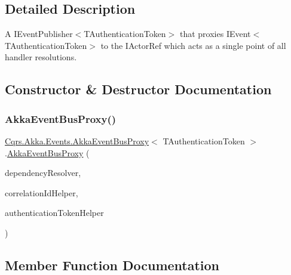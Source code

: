 \subsection{Detailed Description}
A I\+Event\+Publisher$<$\+T\+Authentication\+Token$>$ that proxies I\+Event$<$\+T\+Authentication\+Token$>$ to the I\+Actor\+Ref which acts as a single point of all handler resolutions. 



\subsection{Constructor \& Destructor Documentation}
\mbox{\label{classCqrs_1_1Akka_1_1Events_1_1AkkaEventBusProxy_a2f886b4e9e64188fe69478c39c96f2b5_a2f886b4e9e64188fe69478c39c96f2b5}} 
\subsubsection{\texorpdfstring{Akka\+Event\+Bus\+Proxy()}{AkkaEventBusProxy()}}
{\footnotesize\ttfamily \hyperlink{classCqrs_1_1Akka_1_1Events_1_1AkkaEventBusProxy}{Cqrs.\+Akka.\+Events.\+Akka\+Event\+Bus\+Proxy}$<$ T\+Authentication\+Token $>$.\hyperlink{classCqrs_1_1Akka_1_1Events_1_1AkkaEventBusProxy}{Akka\+Event\+Bus\+Proxy} (\begin{DoxyParamCaption}\item[{\hyperlink{interfaceCqrs_1_1Configuration_1_1IDependencyResolver}{I\+Dependency\+Resolver}}]{dependency\+Resolver,  }\item[{I\+Correlation\+Id\+Helper}]{correlation\+Id\+Helper,  }\item[{\hyperlink{interfaceCqrs_1_1Authentication_1_1IAuthenticationTokenHelper}{I\+Authentication\+Token\+Helper}$<$ T\+Authentication\+Token $>$}]{authentication\+Token\+Helper }\end{DoxyParamCaption})}



\subsection{Member Function Documentation}
\mbox{\label{classCqrs_1_1Akka_1_1Events_1_1AkkaEventBusProxy_a656daead2fe6f30487855dbaea5a3c83_a656daead2fe6f30487855dbaea5a3c83}} 
